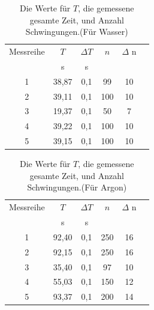 \documentclass[11pt,a4paper]{article} %
\begin{document}
\begin{table} [h]
	\begin{tabular*}{0.99\textwidth}{@{\extracolsep{\fill}}cccccc}
		\toprule
		Messreihe & $T$ & $\Delta T$ & $n$ & $\Delta$ n  \\
		& s & s & &   \\
		\bottomrule
		1 & 38,87 & 0,1 & 99  & 10\\
		2 & 39,11 & 0,1 & 100 & 10\\
		3 & 19,37 &  0,1 & 50 & 7\\
		4 & 39,22 & 0,1 & 100 & 10\\
		5 & 39,15  & 0,1 & 100 & 10 \\
		\bottomrule
	\end{tabular*}
	\caption{Die Werte für $T$, die gemessene gesamte Zeit, und Anzahl Schwingungen.(Für Wasser)}
\end{table} 
\begin{table} [h]
	\begin{tabular*}{0.99\textwidth}{@{\extracolsep{\fill}}cccccc}
		\toprule
		Messreihe & $T$ & $\Delta T$ & $n$ & $\Delta$ n  \\
		& s & s & &   \\
		\bottomrule
		1 & 92,40 & 0,1 & 250  & 16\\
		2 & 92,15 & 0,1 & 250 & 16\\
		3 & 35,40 &  0,1 & 97 & 10\\
		4 & 55,03 & 0,1 & 150 & 12\\
		5 & 93,37  & 0,1 & 200 & 14 \\
		\bottomrule
	\end{tabular*}
	\caption{Die Werte für $T$, die gemessene gesamte Zeit, und Anzahl Schwingungen.(Für Argon)}
\end{table} 
\end{document}
